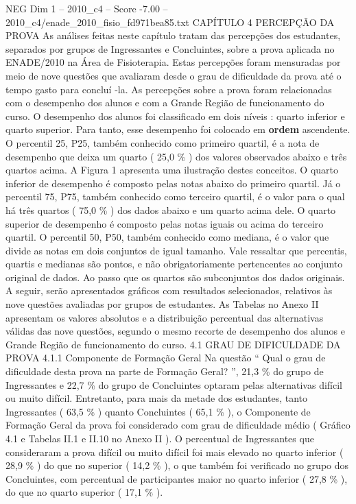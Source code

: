 \begin{textsample}{NEG Dim 1 – 2010\_c4 – Score -7.00 – 2010\_c4/enade\_2010\_fisio\_fd971bea85.txt}  \label{ex:f1_neg_033}
CAPÍTULO 4 PERCEPÇÃO DA PROVA As análises feitas neste capítulo tratam das percepções dos estudantes, separados por grupos de Ingressantes e Concluintes, sobre a prova aplicada no ENADE/2010 na Área de Fisioterapia.
Estas percepções foram mensuradas por meio de nove questões que avaliaram desde o grau de dificuldade da prova até o tempo gasto para concluí -la.
As percepções sobre a prova foram relacionadas com o desempenho dos alunos e com a Grande Região de funcionamento do curso.
O desempenho dos alunos foi classificado em dois níveis : quarto inferior e quarto superior.
Para tanto, esse desempenho foi colocado em \textbf{ordem} ascendente.
O percentil 25, P25, também conhecido como primeiro quartil, é a nota de desempenho que deixa um quarto ( 25,0 \% ) dos valores observados abaixo e três quartos acima.
A Figura 1 apresenta uma ilustração destes conceitos.
O quarto inferior de desempenho é composto pelas notas abaixo do primeiro quartil.
Já o percentil 75, P75, também conhecido como terceiro quartil, é o valor para o qual há três quartos ( 75,0 \% ) dos dados abaixo e um quarto acima dele.
O quarto superior de desempenho é composto pelas notas iguais ou acima do terceiro quartil.
O percentil 50, P50, também conhecido como mediana, é o valor que divide as notas em dois conjuntos de igual tamanho.
Vale ressaltar que percentis, quartis e medianas são pontos, e não obrigatoriamente pertencentes ao conjunto original de dados.
Ao passo que os quartos são subconjuntos dos dados originais.
A seguir, serão apresentados gráficos com resultados selecionados, relativos às nove questões avaliadas por grupos de estudantes.
As Tabelas no Anexo II apresentam os valores absolutos e a distribuição percentual das alternativas válidas das nove questões, segundo o mesmo recorte de desempenho dos alunos e Grande Região de funcionamento do curso. 4.1 GRAU DE DIFICULDADE DA PROVA 4.1.1 Componente de Formação Geral Na questão “ Qual o grau de dificuldade desta prova na parte de Formação Geral? ”, 21,3 \% do grupo de Ingressantes e 22,7 \% do grupo de Concluintes optaram pelas alternativas difícil ou muito difícil.
Entretanto, para mais da metade dos estudantes, tanto Ingressantes ( 63,5 \% ) quanto Concluintes ( 65,1 \% ), o Componente de Formação Geral da prova foi considerado com grau de dificuldade médio ( Gráfico 4.1 e Tabelas II.1 e II.10 no Anexo II ).
O percentual de Ingressantes que consideraram a prova difícil ou muito difícil foi mais elevado no quarto inferior ( 28,9 \% ) do que no superior ( 14,2 \% ), o que também foi verificado no grupo dos Concluintes, com percentual de participantes maior no quarto inferior ( 27,8 \% ), do que no quarto superior ( 17,1 \% ).

\end{textsample}

